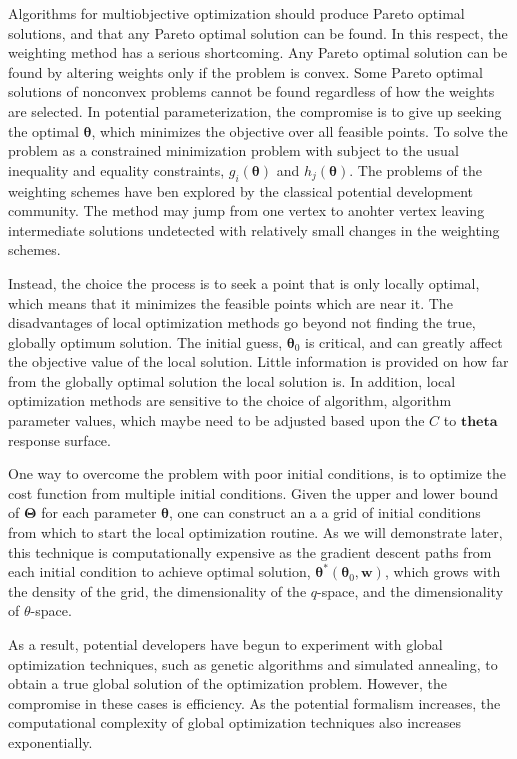 Algorithms for multiobjective optimization should produce Pareto optimal solutions, and that any Pareto optimal solution can be found.  In this respect, the weighting method has a serious shortcoming.  Any Pareto optimal solution can be found by altering weights only if the problem is convex.  Some Pareto optimal solutions of nonconvex problems cannot be found regardless of how the weights are selected.  In potential parameterization, the compromise is to give up seeking the optimal $\bm{\theta}$, which minimizes the objective over all feasible points.  To solve the problem as a constrained minimization problem with subject to the usual inequality and equality constraints, $g_i(\bm{\theta})$ and $h_j(\bm{\theta})$.  The problems of the weighting schemes have ben explored by the classical potential development community.\cite{martinez2013_fitting}  The method may jump from one vertex to anohter vertex leaving intermediate solutions undetected with relatively small changes in the weighting schemes.\cite{martinez2013_fitting}

Instead, the choice the process is to seek a point that is only locally optimal, which means that it minimizes the feasible points which are near it.  The disadvantages of local optimization methods go beyond not finding the true, globally optimum solution.  The initial guess, $\bm{\theta}_0$ is critical, and can greatly affect the objective value of the local solution.  Little information is provided on how far from the globally optimal solution the local solution is.  In addition, local optimization methods are sensitive to the choice of algorithm, algorithm parameter values, which maybe need to be adjusted based upon the $C$ to $\bm{theta}$ response surface.

One way to overcome the problem with poor initial conditions, is to optimize the cost function from multiple initial conditions.  Given the upper and lower bound of $\bm{\Theta}$ for each parameter $\bm{\theta}$, one can construct an a a grid of initial conditions from which to start the local optimization routine.  As we will demonstrate later, this technique is computationally expensive as the gradient descent paths from each initial condition to achieve optimal solution, $\bm{\theta}^*(\bm{\theta}_0,\bm{w})$, which grows with the density of the grid, the dimensionality of the $q$-space, and the dimensionality of $\theta$-space.

As a result, potential developers have begun to experiment with global optimization techniques, such as genetic algorithms and simulated annealing\cite{martinez2013_fitting,martinez2016_posmat}, to obtain a true global solution of the optimization problem.  However, the compromise in these cases is efficiency.  As the potential formalism increases, the computational complexity of global optimization techniques also increases exponentially.

